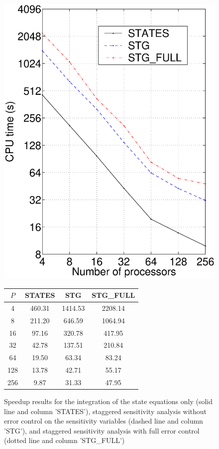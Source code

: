 \begin{figure}
  \begin{minipage}[c]{.5\textwidth}
    \centering
    \includegraphics[width=.85\textwidth]{pvfktTest.eps}
  \end{minipage}
  \begin{minipage}[c]{.5\textwidth}
    \centering
    \begin{tabularx}{\textwidth}{cccc}\hline
      $P$ &  STATES  &   STG   & STG\_FULL \\ \hline
      4  &  460.31  &  1414.53  & 2208.14  \\
      8  &  211.20  &   646.59  & 1064.94  \\
     16  &   97.16  &   320.78  &  417.95  \\
     32  &   42.78  &   137.51  &  210.84  \\
     64  &   19.50  &    63.34  &   83.24  \\
     128  &   13.78  &    42.71  &   55.17  \\
     256  &    9.87  &    31.33  &   47.95  \\ \hline
   \end{tabularx}
 \end{minipage}
 \caption{Speedup results for the integration of the state equations only
   (solid line and column 'STATES'), staggered sensitivity analysis without
   error control on the sensitivity variables (dashed line and column 'STG'),
   and staggered sensitivity analysis with full error control (dotted line and
   column 'STG\_FULL')}
 \label{f:pvfktTest}
\end{figure}


